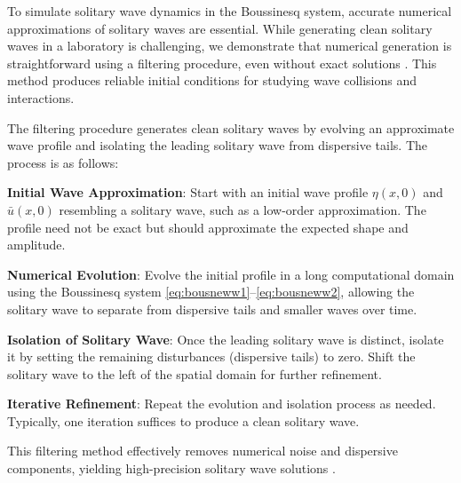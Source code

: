 \documentclass[alpha-refs, 12pt]{wiley-article}
\begin{document}
To simulate solitary wave dynamics in the Boussinesq system, accurate numerical approximations of solitary waves are essential. While generating clean solitary waves in a laboratory is challenging, we demonstrate that numerical generation is straightforward using a filtering procedure, even without exact solutions \cite{BDM2}. This method produces reliable initial conditions for studying wave collisions and interactions.

The filtering procedure generates clean solitary waves by evolving an approximate wave profile and isolating the leading solitary wave from dispersive tails. The process is as follows:
\begin{description}
  \item{\textbf{Initial Wave Approximation}:} Start with an initial wave profile $\eta(x,0)$ and $\bar{u}(x,0)$ resembling a solitary wave, such as a low-order approximation. The profile need not be exact but should approximate the expected shape and amplitude.
  \item{\textbf{Numerical Evolution}:} Evolve the initial profile in a long computational domain using the Boussinesq system \eqref{eq:bousneww1}--\eqref{eq:bousneww2}, allowing the solitary wave to separate from dispersive tails and smaller waves over time.
  \item{\textbf{Isolation of Solitary Wave}:} Once the leading solitary wave is distinct, isolate it by setting the remaining disturbances (dispersive tails) to zero. Shift the solitary wave to the left of the spatial domain for further refinement.
  \item{\textbf{Iterative Refinement}:} Repeat the evolution and isolation process as needed. Typically, one iteration suffices to produce a clean solitary wave.
\end{description}
This filtering method effectively removes numerical noise and dispersive components, yielding high-precision solitary wave solutions \citep{BDM2}.
\end{document}
